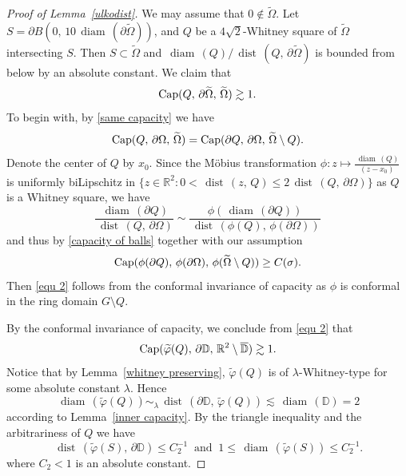 \documentclass[reqno,11pt]{amsart}
\def\dist{{\mathop\mathrm{\,dist\,}}}
\def\wz{\widetilde}
\def\ls{\lesssim}
\def\gs{\gtrsim}
\def\diam{{\mathop\mathrm{\,diam\,}}}
\numberwithin{equation}{section}
\theoremstyle{remark}
\begin{document}
\begin{proof}[Proof of Lemma~\ref{ulkodist}]
We may assume that $0\notin \wz \Omega$. 
Let $S=\partial B(0,\, 10 \diam(\partial \wz  \Omega))$, and $Q$ be a $4\sqrt 2$-Whitney square of $\wz\Omega$ intersecting $S$. Then $S\subset \wz\Omega$ and $\diam(Q)/\dist(Q,\,\partial \wz \Omega)$ is bounded from below by an absolute constant. We claim that
\begin{equation}\label{equ 2}
{\rm Cap}(Q,\, \partial \wz \Omega,\,\wz \Omega)\gs 1.
\end{equation}
To begin with, by \eqref{same capacity} we have
$${\rm Cap}(Q,\, \partial {\Omega} ,\, \wz \Omega) ={\rm Cap}(\partial Q,\, \partial {\Omega} ,\, \wz \Omega \setminus Q). $$
Denote  the center of $Q$ by $x_0$. 
Since the M\"obius transformation $\phi\colon z\mapsto \frac {\diam(Q)} {(z-x_0)}$ is   uniformly biLipschitz in
$\{z\in \mathbb R^2\colon 0< \dist(z,\,Q)\le 2\dist(Q,\,\partial \Omega)\}$ 
as $Q$ is a Whitney square, we have
$$\frac{\diam(\partial Q)}{\dist(Q,\,\partial \Omega)}\sim \frac{\phi(\diam(\partial Q))}{\dist(\phi(Q),\,\phi(\partial \Omega))}$$
and thus by \eqref{capacity of balls} together with our assumption 
$${\rm Cap}(\phi(\partial Q),\, \phi(\partial {\Omega}),\, \phi(\wz \Omega\setminus Q))\ge C(\sigma).$$
Then \eqref{equ 2} follows from the conformal invariance of capacity as $\phi$ is conformal in the ring domain $G\setminus Q$. 

By the conformal invariance of capacity, we conclude from \eqref{equ 2} that
\begin{equation*}
{\rm Cap}(\wz \varphi(Q),\, \partial \mathbb D,\, \mathbb R^2\setminus \overline{\mathbb  D})\gs 1.
\end{equation*}
Notice that by Lemma~\ref{whitney preserving}, $\wz \varphi (Q)$ is of $\lambda$-Whitney-type for some absolute constant $\lambda$. 
Hence  
$$\diam(\wz \varphi (Q))\sim_{\lambda} \dist( \partial \mathbb D,\,\wz \varphi (Q)) \ls \diam(\mathbb D)=2$$ 
according to Lemma~\ref{inner capacity}. By the triangle inequality and the arbitrariness of $Q$ we have 
\begin{equation}\label{equ 3}
 \dist(\wz \varphi (S),\,\partial \mathbb D)\le  C_2^{-1} \ \text{  and  } \ 1\le \diam(\wz \varphi (S))\le C_2^{-1}. 
\end{equation}
where $C_2<1$ is an absolute constant. 


\end{proof}
\end{document}
